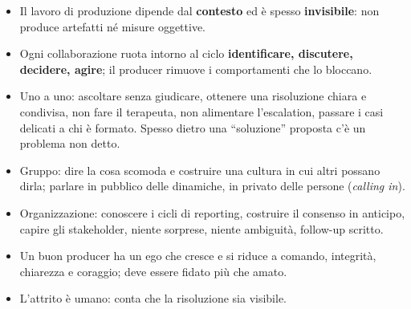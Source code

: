 \begin{itemize}
  \item Il lavoro di produzione dipende dal \textbf{contesto} ed è spesso
        \textbf{invisibile}: non produce artefatti né misure oggettive.
  \item Ogni collaborazione ruota intorno al ciclo \textbf{identificare, discutere,
        decidere, agire}; il producer rimuove i comportamenti che lo bloccano.
  \item Uno a uno: ascoltare senza giudicare, ottenere una risoluzione chiara e
        condivisa, non fare il terapeuta, non alimentare l'escalation, passare i
        casi delicati a chi è formato. Spesso dietro una ``soluzione'' proposta c'è
        un problema non detto.
  \item Gruppo: dire la cosa scomoda e costruire una cultura in cui altri possano
        dirla; parlare in pubblico delle dinamiche, in privato delle persone
        (\emph{calling in}).
  \item Organizzazione: conoscere i cicli di reporting, costruire il consenso in
        anticipo, capire gli stakeholder, niente sorprese, niente ambiguità,
        follow-up scritto.
  \item Un buon producer ha un ego che cresce e si riduce a comando, integrità,
        chiarezza e coraggio; deve essere fidato più che amato.
  \item L'attrito è umano: conta che la risoluzione sia visibile.
\end{itemize}
